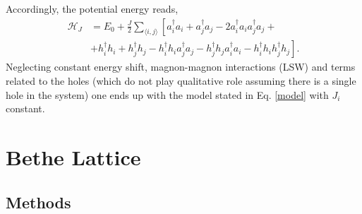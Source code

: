 \documentclass[%
 reprint,
 amsmath,amssymb,
 aps,
prb,
floatfix,
]{revtex4-1}
\newcommand{\mean}[1]{\langle#1\rangle}
\begin{document}
Accordingly, the potential energy reads,
\begin{equation}
\begin{aligned}
\mathcal{H}_J &= E_0 + \frac{J}{2} \sum_{\mean{i,j}} \left[ a_i^\dag a_i + a_j^\dag a_j - 2 a_i^\dag a_i a_j^\dag a_j \right. + \\
&+\left. h_i^\dag h_i + h_j^\dag h_j - h_i^\dag h_i a_j^\dag a_j - h_j^\dag h_j a_i^\dag a_i - h_i^\dag h_i h_j^\dag h_j \right].
\end{aligned}
\end{equation}
Neglecting constant energy shift, magnon-magnon interactions (LSW) and terms related to the holes (which do not play qualitative role assuming there is a single hole in the system) one ends up with the model stated in Eq. \ref{model} with $J_i$ constant.

\section{Bethe Lattice}
\subsection{Methods}
\end{document}
